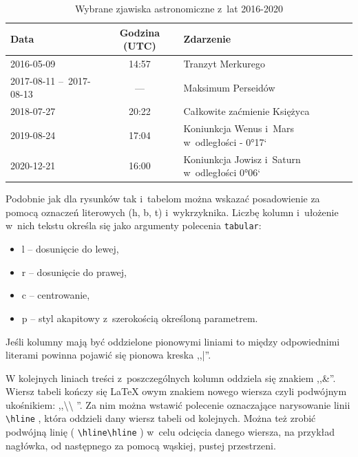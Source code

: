 \begin{table}[h]
    \centering
    \begin{tabular}{p{2.5cm}c|l}
        Data                     & Godzina (UTC) & Zdarzenie                                     \\\hline\hline
        2016-05-09               & 14:57         & Tranzyt Merkurego                             \\\hline
        2017-08-11 --~2017-08-13 & ---           & Maksimum Perseidów                            \\\hline
        2018-07-27               & 20:22         & Całkowite zaćmienie Księżyca                  \\\hline
        2019-08-24               & 17:04         & Koniunkcja Wenus i~Mars w~odległości - 0°17`  \\\hline
        2020-12-21               & 16:00         & Koniunkcja Jowisz i~Saturn w~odległości 0°06`
    \end{tabular}
    \caption{\label{tab:zjawiska}Wybrane zjawiska astronomiczne z~lat 2016-2020}
\end{table}

Podobnie jak dla rysunków tak i~tabelom można wskazać posadowienie za pomocą oznaczeń literowych (h, b, t)
i~wykrzyknika. Liczbę kolumn i~ułożenie w~nich tekstu określa się jako argumenty polecenia \texttt{tabular}:
\begin{itemize}
    \item l -- dosunięcie do lewej,
    \item r -- dosunięcie do prawej,
    \item c -- centrowanie,
    \item p -- styl akapitowy z~szerokością określoną parametrem.
\end{itemize}
Jeśli kolumny mają być oddzielone pionowymi liniami to między odpowiednimi literami powinna pojawić się pionowa kreska
,,|''.

W kolejnych liniach treści z~poszczególnych kolumn oddziela się znakiem ,,\&''. Wiersz tabeli kończy się {\LaTeX}
owym znakiem nowego wiersza czyli podwójnym ukośnikiem: ,,\textbackslash\textbackslash
''. Za nim można wstawić polecenie oznaczające narysowanie linii \texttt{\textbackslash{}hline}
, która oddzieli dany wiersz tabeli od kolejnych. Można też zrobić podwójną linię (
\texttt{\textbackslash{}hline\textbackslash{}hline}
) w~celu odcięcia danego wiersza, na przykład nagłówka, od następnego za pomocą wąskiej, pustej przestrzeni.

